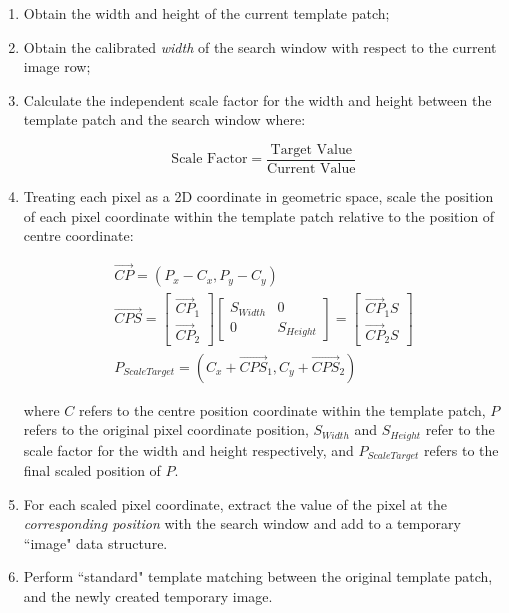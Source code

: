 \begin{enumerate}
	\item Obtain the width and height of the current template patch;
	\item Obtain the calibrated \textit{width} of the search window with respect to the current image row;
	\item Calculate the independent scale factor for the width and height between the template patch and the search window where:
	
	\begin{equation}
		\text{Scale Factor} = \frac{\text{Target Value}}{\text{Current Value}}
	\end{equation}
	 
	\item Treating each pixel as a 2D coordinate in geometric space, scale the position of each pixel coordinate within the template patch relative to the position of centre coordinate:

	\begin{gather} 
 \vec{CP} = (P_{x} - C_{x}, P_{y} - C_{y})
 \\
\vec{CPS} = \begin{bmatrix} \vec{CP}_{1} \\ \vec{CP}_{2} \end{bmatrix}\begin{bmatrix} S_{Width} & 0 \\ 0 & S_{Height} \end{bmatrix} = \begin{bmatrix} \vec{CP}_{1}S \\ \vec{CP}_{2}S \end{bmatrix}
\\
P_{ScaleTarget} = (C_{x} + \vec{CPS}_{1}, C_{y} + \vec{CPS}_{2}) 
\end{gather} 
		
where $C$ refers to the centre position coordinate within the template patch, $P$ refers to the original pixel coordinate position, $S_{Width}$ and $S_{Height}$ refer to the scale factor for the width and height respectively, and $P_{ScaleTarget}$ refers to the final scaled position of $P$. 

\item For each scaled pixel coordinate, extract the value of the pixel at the \textit{corresponding position} with the search window and add to a temporary ``image" data structure.

\item Perform ``standard" template matching between the original template patch, and the newly created temporary image.
	
\end{enumerate}

